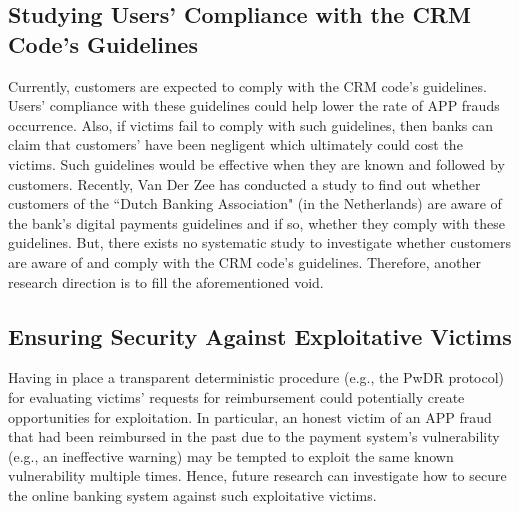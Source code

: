 \subsection{Studying Users' Compliance with the CRM Code's Guidelines}

Currently,   customers are expected to comply with the CRM code's guidelines.  Users'  compliance with these guidelines  could help lower the rate of APP frauds occurrence.  Also, if victims fail to comply with such  guidelines, then banks can claim that customers' have been negligent which ultimately could cost the victims. Such guidelines would be effective when they are known and followed by customers. Recently, Van Der Zee \cite{zee2021shifting}  has conducted a study to find out whether customers of the ``Dutch Banking Association" (in the Netherlands) are aware of the bank's digital payments guidelines and if so, whether they comply with these guidelines.  But, there exists no systematic study to  investigate whether  customers are aware of and comply with the CRM code's  guidelines. Therefore, another research direction is to fill  the aforementioned void. 



\subsection{Ensuring Security Against Exploitative Victims}



Having in place a transparent deterministic procedure (e.g.,  the PwDR protocol)  for evaluating victims' requests for reimbursement  could potentially create opportunities for exploitation. In particular, an honest victim  of an APP fraud that had been reimbursed in the past due to the payment system's vulnerability (e.g., an  ineffective warning) may be tempted to  exploit the same  known vulnerability multiple times. Hence, future research can investigate how to secure the online banking system against such exploitative victims.











